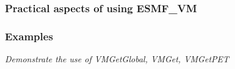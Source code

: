 
\subsubsection{Practical aspects of using ESMF\_VM}

\subsubsection{Examples}
{\em Demonstrate the use of VMGetGlobal, VMGet, VMGetPET}
